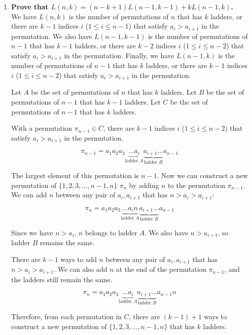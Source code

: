 \documentclass[10pt]{article}
\begin{document}
\begin{enumerate}
\begin{enumerate}
	\item
	\textbf{Prove that $L(n,k) = (n-k+1)L(n-1,k-1) + kL(n-1,k)$.}\\

    We have $L(n,k)$ is the number of permutations of $n$ that has $k$ ladders, or there are $k-1$ indices $i$ ($1 \leq i \leq n-1$) that satisfy $a_i > a_{i+1}$ in the permutation. We also have $L(n-1,k-1)$ is the number of permutations of $n-1$ that has $k-1$ ladders, or there are $k-2$ indices $i$ ($1 \leq i \leq n-2$) that satisfy $a_i > a_{i+1}$ in the permutation. Finally, we have $L(n-1,k)$ is the number of permutations of $n-1$ that has $k$ ladders, or there are $k-1$ indices $i$ ($1 \leq i \leq n-2$) that satisfy $a_i > a_{i+1}$ in the permutation.

    Let $A$ be the set of permutations of $n$ that has $k$ ladders. Let $B$ be the set of permutations of $n-1$ that has $k-1$ ladders. Let $C$ be the set of permutations of $n-1$ that has $k$ ladders.

    With a permutation $\pi_{n-1} \in C$, there are $k-1$ indices $i$ ($1 \leq i \leq n-2$) that satisfy $a_i > a_{i+1}$ in the permutation. 

    $$\pi_{n-1} = a_1a_2a_3\underbrace{\ldots a_i}_{\text{ladder $A$}}\underbrace{ a_{i+1}\ldots}_{\text{ladder $B$}} a_{n-1}$$
    
    The largest element of this permutation is $n-1$. Now we can construct a new permutation of $\{1,2,3,\ldots,n-1,n\}$ $\pi_n$ by adding $n$ to the permutation $\pi_{n-1}$. We can add $n$ between any pair of $a_i, a_{i+1}$ that has $n > a_i > a_{i+1}$:

    $$\pi_{n} = a_1a_2a_3\underbrace{\ldots a_in}_{\text{ladder $A$}}\underbrace{ a_{i+1}\ldots}_{\text{ladder $B$}} a_{n-1}$$

    Since we have $n > a_i$, $n$ belongs to ladder $A$. We also have $n > a_{i+1}$, so ladder $B$ remains the same.

    There are $k-1$ ways to add $n$ between any pair of $a_i, a_{i+1}$ that has $n > a_i > a_{i+1}$. We can also add $n$ at the end of the permutation $\pi_{n-1}$, and the ladders still remain the same.

    $$\pi_{n} = a_1a_2a_3\underbrace{\ldots a_i}_{\text{ladder $A$}}\underbrace{ a_{i+1}\ldots}_{\text{ladder $B$}} a_{n-1}n$$

    Therefore, from each permutation in $C$, there are $(k-1)+1$ ways to construct a new permutation of $\{1,2,3,\ldots,n-1,n\}$ that has $k$ ladders.


\end{enumerate}
\end{enumerate}
\end{document}
